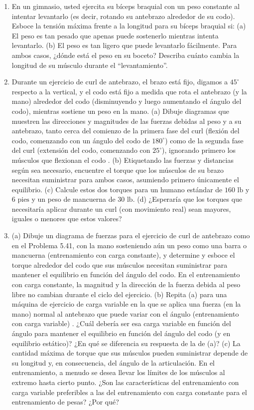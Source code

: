\documentclass[12pt]{book}
\begin{document}
\begin{enumerate}
\item[5.40] En un gimnasio, usted ejercita su bíceps braquial con un peso constante al intentar levantarlo (es decir, rotando su antebrazo alrededor de su codo). Esboce la tensión máxima frente a la longitud para su bíceps braquial si:
(a) El peso es tan pesado que apenas puede sostenerlo mientras intenta levantarlo.
(b) El peso es tan ligero que puede levantarlo fácilmente.
Para ambos casos, ¿dónde está el peso en su boceto? Describa cuánto cambia la longitud de su músculo durante el ``levantamiento''.

\item[5.41] Durante un ejercicio de curl de antebrazo, el brazo está fijo, digamos a $45^\circ$ respecto a la vertical, y el codo está fijo a medida que rota el antebrazo (y la mano) alrededor del codo (disminuyendo y luego aumentando el ángulo del codo), mientras sostiene un peso en la mano.
(a) Dibuje diagramas que muestren las direcciones y magnitudes de las fuerzas debidas al peso y a su antebrazo, tanto cerca del comienzo de la primera fase del curl (flexión del codo, comenzando con un ángulo del codo de $180^\circ$) como de la segunda fase del curl (extensión del codo, comenzando con $25^\circ$), ignorando primero los músculos que flexionan el codo \cite{16}.
(b) Etiquetando las fuerzas y distancias según sea necesario, encuentre el torque que los músculos de su brazo necesitan suministrar para ambos casos, asumiendo primero únicamente el equilibrio.
(c) Calcule estos dos torques para un humano estándar de $160\text{ lb}$ y $6\text{ pies}$ y un peso de mancuerna de $30\text{ lb}$.
(d) ¿Esperaría que los torques que necesitaría aplicar durante un curl (con movimiento real) sean mayores, iguales o menores que estos valores?

\item[5.42] (a) Dibuje un diagrama de fuerzas para el ejercicio de curl de antebrazo como en el Problema 5.41, con la mano sosteniendo aún un peso como una barra o mancuerna (entrenamiento con carga constante), y determine y esboce el torque alrededor del codo que sus músculos necesitan suministrar para mantener el equilibrio en función del ángulo del codo. En el entrenamiento con carga constante, la magnitud y la dirección de la fuerza debida al peso libre no cambian durante el ciclo del ejercicio.
(b) Repita (a) para una máquina de ejercicio de carga variable en la que se aplica una fuerza (en la mano) normal al antebrazo que puede variar con el ángulo (entrenamiento con carga variable) \cite{16, 54}. ¿Cuál debería ser esa carga variable en función del ángulo para mantener el equilibrio en función del ángulo del codo (y en equilibrio estático)? ¿En qué se diferencia su respuesta de la de (a)?
(c) La cantidad máxima de torque que sus músculos pueden suministrar depende de su longitud y, en consecuencia, del ángulo de la articulación. En el entrenamiento, a menudo se desea llevar los límites de los músculos al extremo hasta cierto punto. ¿Son las características del entrenamiento con carga variable preferibles a las del entrenamiento con carga constante para el entrenamiento de pesas? ¿Por qué?


\end{enumerate}
\end{document}

